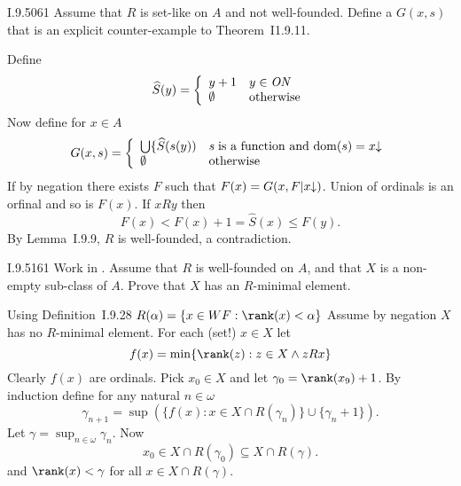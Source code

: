 \begin{lexcopy}{I.9.50}{61}
Assume that $R$ is set-like on $A$ and not well-founded. Define
a \(G(x,s)\) that is an explicit counter-example to Theorem~I1.9.11.
\end{lexcopy}
Define
\begin{equation*}
\widehat{S}(y) =
 \left\{
 \begin{array}{ll}
 y + 1 & y \in \mathit{ON} \\
 \emptyset & \textnormal{otherwise}
 \end{array}\right.
\end{equation*}
Now define for \(x\in A\)
\begin{equation*}
G(x,s) =
 \left\{
 \begin{array}{ll}
  \bigcup \{\widehat{S}(s(y)) &
    s \;\textnormal{is a function and}\, \mathop{\mathrm{dom}}(s)=x\kern -0.3em\downarrow \\
 \emptyset & \textnormal{otherwise}
 \end{array}\right.
\end{equation*}
If by negation there exists $F$ such that
\(F(x) = G(x,F\vert x\kern -0.3em\downarrow)\).
Union of ordinals is an orfinal and so is \(F(x)\).
If \(xRy\) then
\begin{equation*}
F(x) < F(x) + 1 = \widehat{S}(x) \leq F(y).
\end{equation*}
By Lemma~I.9.9, $R$ is well-founded, a contradiction.

\begin{lexcopy}{I.9.51}{61}
Work in \ZF. Assume that $R$ is well-founded on $A$, and that
$X$ is a non-empty sub-class of $A$. Prove that $X$ has an $R$-minimal element.
\end{lexcopy}
Using Definition~I.9.28 \(R(\alpha) = \{x \in WF : \rank(x) < \alpha\}\)
Assume by negation $X$ has no $R$-minimal element.
For each (set!) \(x\in X\) let
\begin{equation*}
f(x) = \min\{\rank(z) : z \in X \wedge zRx\}
\end{equation*}
Clearly \(f(x)\) are ordinals. Pick \(x_0 \in X\) and let
\(\gamma_0 = \rank(x_9) + 1\). By induction define for any natural \(n\in\omega\)
\begin{equation*}
\gamma_{n+1} = \sup\left(\{f(x): x \in X\cap R(\gamma_n)\} \cup
  \{\gamma_n + 1\}\right).
\end{equation*}
Let \(\gamma = \sup_{n\in\omega} \gamma_n\). Now
\begin{equation*}
x_0 \in X\cap R(\gamma_0) \subseteq X\cap R(\gamma).
\end{equation*}
and \(\rank(x) < \gamma\) for all \(x\in X\cap R(\gamma)\).

